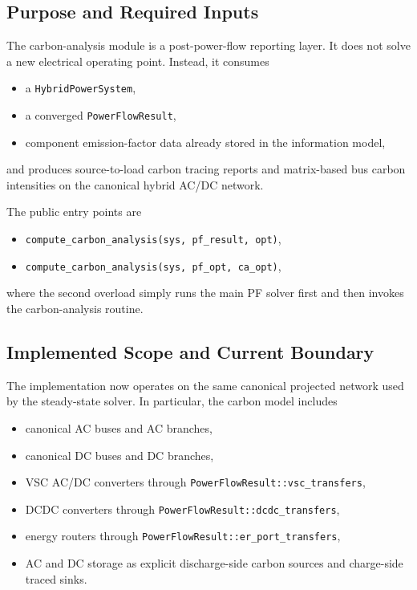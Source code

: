 \subsection{Purpose and Required Inputs}

The carbon-analysis module is a post-power-flow reporting layer.  It does not
solve a new electrical operating point.  Instead, it consumes
\begin{itemize}
  \item a \texttt{HybridPowerSystem},
  \item a converged \texttt{PowerFlowResult},
  \item component emission-factor data already stored in the information model,
\end{itemize}
and produces source-to-load carbon tracing reports and matrix-based bus carbon
intensities on the canonical hybrid AC/DC network.

The public entry points are
\begin{itemize}
  \item \texttt{compute\_carbon\_analysis(sys, pf\_result, opt)},
  \item \texttt{compute\_carbon\_analysis(sys, pf\_opt, ca\_opt)},
\end{itemize}
where the second overload simply runs the main PF solver first and then invokes
the carbon-analysis routine.

\subsection{Implemented Scope and Current Boundary}

The implementation now operates on the same canonical projected network used by
the steady-state solver.  In particular, the carbon model includes
\begin{itemize}
  \item canonical AC buses and AC branches,
  \item canonical DC buses and DC branches,
  \item VSC AC/DC converters through \texttt{PowerFlowResult::vsc\_transfers},
  \item DCDC converters through \texttt{PowerFlowResult::dcdc\_transfers},
  \item energy routers through \texttt{PowerFlowResult::er\_port\_transfers},
  \item AC and DC storage as explicit discharge-side carbon sources and charge-side traced sinks.
\end{itemize}

